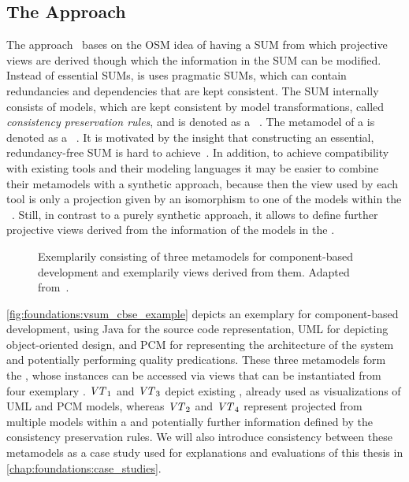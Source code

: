 \subsection{The \vitruv Approach}
\label{chap:foundations:multiview:vitruv}

The \vitruv approach~ bases on the \gls{OSM} idea of having a \gls{SUM} from which projective views are derived though which the information in the \gls{SUM} can be modified.
Instead of essential \glspl{SUM}, is uses pragmatic \glspl{SUM}, which can contain redundancies and dependencies that are kept consistent.
The \gls{SUM} internally consists of models, which are kept consistent by model transformations, called \emph{consistency preservation rules}, and is denoted as a \vsum~.
The metamodel of a \vsum is denoted as a \vsumm~.
It is motivated by the insight that constructing an essential, redundancy-free \gls{SUM} is hard to achieve~.
In addition, to achieve compatibility with existing tools and their modeling languages it may be easier to combine their metamodels with a synthetic approach, because then the view used by each tool is only a projection given by an isomorphism to one of the models within the \vsum~.
Still, in contrast to a purely synthetic approach, it allows to define further projective views derived from the information of the models in the \vsum.

\begin{figure}
    \centering
    
    \caption[Exemplary \acrshort{VSUMM}]{Exemplarily \vsumm consisting of three metamodels for component-based development and exemplarily views derived from them. Adapted from~\cite[Fig.~4.4]{langhammer2017a}.}
    \label{fig:foundations:vsum_cbse_example}
\end{figure}

\autoref{fig:foundations:vsum_cbse_example} depicts an exemplary \vsumm for component-based development, using Java for the source code representation, \gls{UML} for depicting object-oriented design, and \gls{PCM} for representing the architecture of the system and potentially performing quality predications.
These three metamodels form the \vsumm, whose instances can be accessed via views that can be instantiated from four exemplary \viewtypes.
$\mathit{VT}_1$ and $\mathit{VT}_3$ depict existing \viewtypes, already used as visualizations of \gls{UML} and \gls{PCM} models, whereas $\mathit{VT}_2$ and $\mathit{VT}_4$ represent \viewtypes projected from multiple models within a \vsum and potentially further information defined by the consistency preservation rules.
We will also introduce consistency between these metamodels as a case study used for explanations and evaluations of this thesis in \autoref{chap:foundations:case_studies}.

